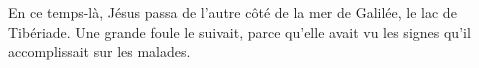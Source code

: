 En ce temps-là, Jésus passa de l’autre côté de la mer de Galilée,
	le lac de Tibériade.
Une grande foule le suivait,
	parce qu’elle avait vu les signes qu’il accomplissait sur les malades.
